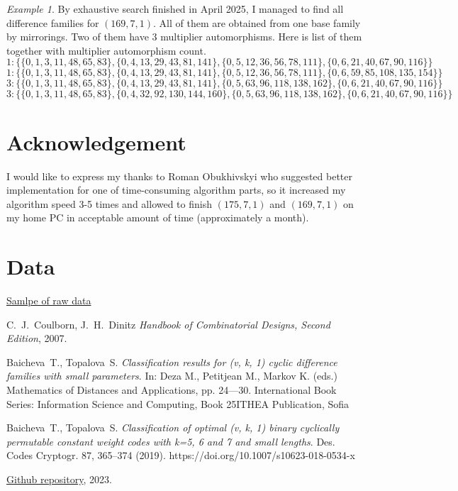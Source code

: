 \documentclass{amsart}
\theoremstyle{plain}
\theoremstyle{definition}
\theoremstyle{remark}
\newtheorem{example}{Example}[section]
\begin{document}
\begin{example} By exhaustive search finished in April 2025, I managed to find all difference families for $(169,7,1)$. All of them are obtained from one base family by mirrorings. Two of them have 3 multiplier automorphisms. Here is list of them together with multiplier automorphism count.
$$1: \{\{0, 1, 3, 11, 48, 65, 83\}, \{0, 4, 13, 29, 43, 81, 141\}, \{0, 5, 12, 36, 56, 78, 111\}, \{0, 6, 21, 40, 67, 90, 116\}\}$$
$$1: \{\{0, 1, 3, 11, 48, 65, 83\}, \{0, 4, 13, 29, 43, 81, 141\}, \{0, 5, 12, 36, 56, 78, 111\}, \{0, 6, 59, 85, 108, 135, 154\}\}$$
$$3: \{\{0, 1, 3, 11, 48, 65, 83\}, \{0, 4, 13, 29, 43, 81, 141\}, \{0, 5, 63, 96, 118, 138, 162\}, \{0, 6, 21, 40, 67, 90, 116\}\}$$
$$3: \{\{0, 1, 3, 11, 48, 65, 83\}, \{0, 4, 32, 92, 130, 144, 160\}, \{0, 5, 63, 96, 118, 138, 162\}, \{0, 6, 21, 40, 67, 90, 116\}\}$$
\end{example}

\section{Acknowledgement}

I would like to express my thanks to Roman Obukhivskyi who suggested better implementation for one of time-consuming algorithm parts, so it increased my algorithm speed 3-5 times and allowed to finish $(175,7,1)$ and $(169,7,1)$ on my home PC in acceptable amount of time (approximately a month).

\section{Data}

\href{data/151-6.txt}{Samlpe of raw data}

\begin{thebibliography}{}

 C.~J.~Coulborn, J.~H.~Dinitz {\em Handbook of Combinatorial Designs, Second Edition}, 2007.

 Baicheva~T., Topalova~S. {\em Classification results for (v, k, 1) cyclic difference families with small parameters}. In: Deza M., Petitjean M., Markov K. (eds.) Mathematics of Distances and Applications, pp. 24---30. International Book Series: Information Science and Computing, Book 25ITHEA Publication, Sofia

 Baicheva~T., Topalova~S. {\em Classification of optimal (v, k, 1) binary cyclically permutable constant weight codes with k=5, 6 and 7 and small lengths}. Des. Codes Cryptogr. 87, 365–374 (2019). https://doi.org/10.1007/s10623-018-0534-x

 \href{https://github.com/Ihromant/math-utils/blob/44bf2c6964a4f70c3349859b6b75ef2fe486ab7a/src/test/java/ua/ihromant/mathutils/BibdFinder1Test.java}{Github repository}, 2023.

\end{thebibliography}
\end{document}
